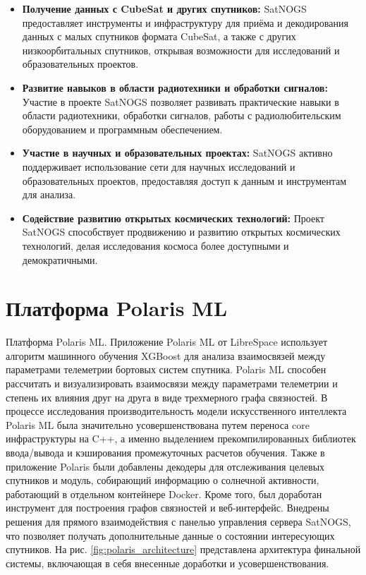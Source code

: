 \documentclass[12pt, a4paper]{extreport}
\begin{document}
\begin{itemize}
    \item \textbf{Получение данных с CubeSat и других спутников:} SatNOGS предоставляет инструменты и инфраструктуру для приёма и декодирования данных с малых спутников формата CubeSat, а также с других низкоорбитальных спутников,  открывая возможности для исследований и образовательных проектов.
    \item \textbf{Развитие навыков в области радиотехники и обработки сигналов:} Участие в проекте SatNOGS позволяет развивать практические навыки в области радиотехники, обработки сигналов,  работы с радиолюбительским оборудованием и программным обеспечением.
    \item \textbf{Участие в научных и образовательных проектах:}  SatNOGS  активно поддерживает использование сети для научных исследований и образовательных проектов,  предоставляя доступ к данным и инструментам для анализа.
    \item \textbf{Содействие развитию открытых космических технологий:} Проект SatNOGS способствует продвижению и развитию открытых космических технологий, делая исследования космоса более доступными и демократичными.
\end{itemize}

\newpage

\section{Платформа Polaris ML}

Платформа Polaris ML. Приложение Polaris ML от LibreSpace использует алгоритм машинного обучения XGBoost для анализа взаимосвязей между параметрами телеметрии бортовых систем спутника. Polaris ML способен рассчитать и визуализировать взаимосвязи между параметрами телеметрии и степень их влияния друг на друга в виде трехмерного графа связностей. В процессе исследования производительность модели искусственного интеллекта Polaris ML была значительно усовершенствована путем переноса core инфраструктуры на C++, а именно выделением прекомпилированных библиотек ввода/вывода и кэширования промежуточных расчетов обучения. Также в приложение Polaris были добавлены декодеры для отслеживания целевых спутников и модуль, собирающий информацию о солнечной активности, работающий в отдельном контейнере Docker. Кроме того, был доработан инструмент для построения графов связностей и веб-интерфейс. Внедрены решения для прямого взаимодействия с панелью управления сервера SatNOGS, что позволяет получать дополнительные данные о состоянии интересующих спутников.
На рис. \ref{fig:polaris_architecture} представлена архитектура финальной системы, включающая в себя внесенные доработки и усовершенствования.
\end{document}

